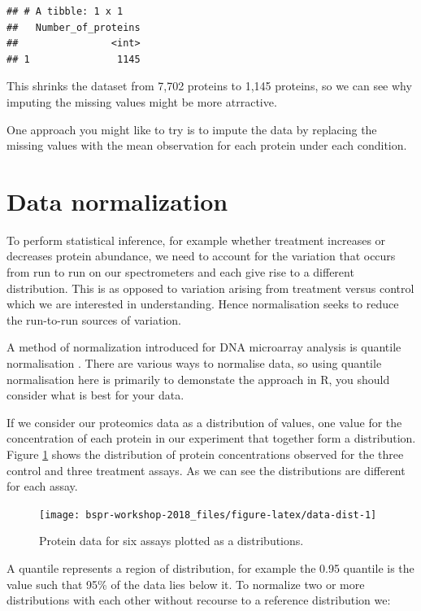 \documentclass[12pt,]{book}
\theoremstyle{definition}
\theoremstyle{definition}
\theoremstyle{definition}
\theoremstyle{remark}
\begin{document}
\begin{verbatim}
## # A tibble: 1 x 1
##   Number_of_proteins
##                <int>
## 1               1145
\end{verbatim}

This shrinks the dataset from 7,702 proteins to 1,145 proteins, so we
can see why imputing the missing values might be more atrractive.

One approach you might like to try is to impute the data by replacing
the missing values with the mean observation for each protein under each
condition.

\section{Data normalization}\label{normalisation}

To perform statistical inference, for example whether treatment
increases or decreases protein abundance, we need to account for the
variation that occurs from run to run on our spectrometers and each give
rise to a different distribution. This is as opposed to variation
arising from treatment versus control which we are interested in
understanding. Hence normalisation seeks to reduce the run-to-run
sources of variation.

A method of normalization introduced for DNA microarray analysis is
quantile normalisation \citep{bolstad2003}. There are various ways to
normalise data, so using quantile normalisation here is primarily to
demonstate the approach in R, you should consider what is best for your
data.

If we consider our proteomics data as a distribution of values, one
value for the concentration of each protein in our experiment that
together form a distribution. Figure \ref{fig:data-dist} shows the
distribution of protein concentrations observed for the three control
and three treatment assays. As we can see the distributions are
different for each assay.



\begin{figure}

{\centering \texttt{[image: bspr-workshop-2018\_files/figure-latex/data-dist-1]} 

}

\caption{Protein data for six assays plotted as a distributions.}\label{fig:data-dist}
\end{figure}

A quantile represents a region of distribution, for example the 0.95
quantile is the value such that 95\% of the data lies below it. To
normalize two or more distributions with each other without recourse to
a reference distribution we:
\end{document}
